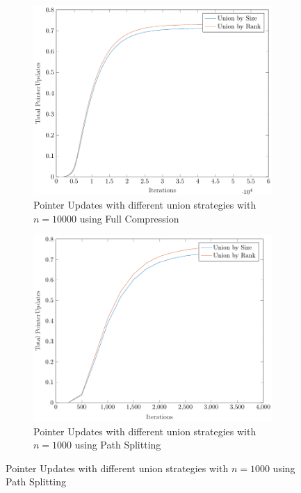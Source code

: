 \begin{figure}[ht]
\begin{subfigure}{0.32\textwidth}
    \end{subfigure}%
    \hfill
    \begin{subfigure}{0.32\textwidth}
        \centering
        \includegraphics[width=\textwidth]{../images/plotFCNonFull10000_PointerUpdates.pdf}
        \caption{Pointer Updates with different union strategies with $n = 10000$ using Full Compression}
    \end{subfigure}
    \begin{subfigure}{0.32\textwidth}
        \centering
        \includegraphics[width=\textwidth]{../images/plotPSNonFull1000_PointerUpdates.pdf}
        \caption{Pointer Updates with different union strategies with $n = 1000$ using Path Splitting}

\end{subfigure}
\end{figure}
